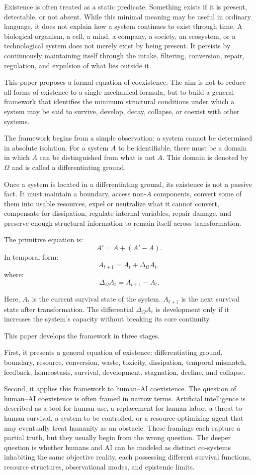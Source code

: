 \documentclass[11pt,a4paper]{article}
\begin{document}
Existence is often treated as a static predicate. Something exists if it is present, detectable, or not absent. While this minimal meaning may be useful in ordinary language, it does not explain how a system continues to exist through time. A biological organism, a cell, a mind, a company, a society, an ecosystem, or a technological system does not merely exist by being present. It persists by continuously maintaining itself through the intake, filtering, conversion, repair, regulation, and expulsion of what lies outside it.

This paper proposes a formal equation of coexistence. The aim is not to reduce all forms of existence to a single mechanical formula, but to build a general framework that identifies the minimum structural conditions under which a system may be said to survive, develop, decay, collapse, or coexist with other systems.

The framework begins from a simple observation: a system cannot be determined in absolute isolation. For a system $A$ to be identifiable, there must be a domain in which $A$ can be distinguished from what is not $A$. This domain is denoted by $\Omega$ and is called a differentiating ground.

Once a system is located in a differentiating ground, its existence is not a passive fact. It must maintain a boundary, access non-$A$ components, convert some of them into usable resources, expel or neutralize what it cannot convert, compensate for dissipation, regulate internal variables, repair damage, and preserve enough structural information to remain itself across transformation.

The primitive equation is:
\[
A' = A + (A'-A).
\]
In temporal form:
\[
A_{t+1}=A_t+\Delta_{\Omega}A_t,
\]
where:
\[
\Delta_{\Omega}A_t=A_{t+1}-A_t.
\]

Here, $A_t$ is the current survival state of the system. $A_{t+1}$ is the next survival state after transformation. The differential $\Delta_{\Omega}A_t$ is development only if it increases the system's capacity without breaking its core continuity.

This paper develops the framework in three stages.

First, it presents a general equation of existence: differentiating ground, boundary, resource, conversion, waste, toxicity, dissipation, temporal mismatch, feedback, homeostasis, survival, development, stagnation, decline, and collapse.

Second, it applies this framework to human--AI coexistence. The question of human--AI coexistence is often framed in narrow terms. Artificial intelligence is described as a tool for human use, a replacement for human labor, a threat to human survival, a system to be controlled, or a resource-optimizing agent that may eventually treat humanity as an obstacle. These framings each capture a partial truth, but they usually begin from the wrong question. The deeper question is whether humans and AI can be modeled as distinct co-systems inhabiting the same objective reality, each possessing different survival functions, resource structures, observational modes, and epistemic limits.
\end{document}
